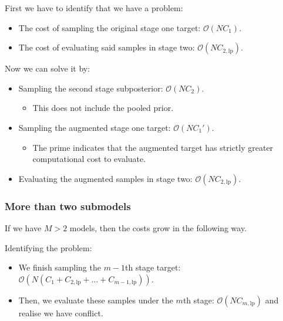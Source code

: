 \documentclass[10pt,a4paper,]{article}
\providecommand{\tightlist}{%
  \setlength{\itemsep}{0pt}\setlength{\parskip}{0pt}}
\newcommand{\Nx}{N}
\newcommand{\Nm}{M}
\newcommand{\modelindex}{m}
\begin{document}
First we have to identify that we have a problem:

\begin{itemize}
\tightlist
\item
  The cost of sampling the original stage one target:
  \(\mathcal{O}(\Nx C_{1})\).
\item
  The cost of evaluating said samples in stage two:
  \(\mathcal{O}(\Nx C_{2, \text{lp}})\).
\end{itemize}

Now we can solve it by:

\begin{itemize}
\tightlist
\item
  Sampling the second stage subposterior: \(\mathcal{O}(\Nx C_{2})\).

  \begin{itemize}
  \tightlist
  \item
    This does not include the pooled prior.
  \end{itemize}
\item
  Sampling the augmented stage one target: \(\mathcal{O}(\Nx C_{1}')\).

  \begin{itemize}
  \tightlist
  \item
    The prime indicates that the augmented target has strictly greater
    computational cost to evaluate.
  \end{itemize}
\item
  Evaluating the augmented samples in stage two:
  \(\mathcal{O}(\Nx C_{2, \text{lp}})\).
\end{itemize}

\subsubsection*{More than two submodels}\label{more-than-two-submodels}

If we have \(\Nm > 2\) models, then the costs grow in the following way.

Identifying the problem:

\begin{itemize}
\tightlist
\item
  We finish sampling the \(\modelindex-1\)th stage target:
  \(\mathcal{O}(\Nx (C_{1} + C_{2, \text{lp}} + \ldots + C_{\modelindex - 1, \text{lp}}))\).
\item
  Then, we evaluate these samples under the \(\modelindex\)th stage:
  \(\mathcal{O}(\Nx C_{\modelindex, \text{lp}})\) and realise we have
  conflict.
\end{itemize}
\end{document}
